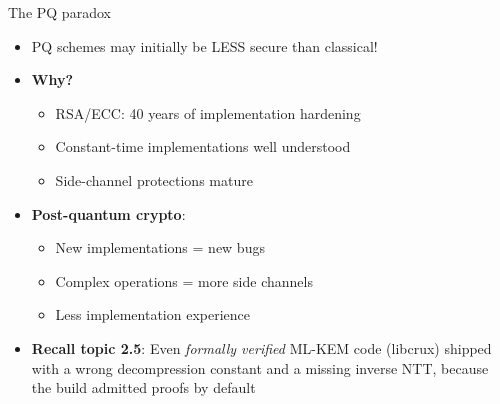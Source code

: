 \ifdefined\PRESENTATION\else\PassOptionsToClass{handout}{beamer}\fi\documentclass[aspectratio=169, lualatex]{beamer}
\begin{document}
\begin{frame}{The PQ paradox}
	\begin{itemize}
		\item PQ schemes may initially be LESS secure than classical!
		\item \textbf{Why?}
		      \begin{itemize}
			      \item RSA/ECC: 40 years of implementation hardening
			      \item Constant-time implementations well understood
			      \item Side-channel protections mature
		      \end{itemize}
		\item \textbf{Post-quantum crypto}:
		      \begin{itemize}
			      \item New implementations = new bugs
			      \item Complex operations = more side channels
			      \item Less implementation experience
		      \end{itemize}
		\item \textbf{Recall topic 2.5}: Even \textit{formally verified} ML-KEM code (libcrux) shipped with a wrong decompression constant and a missing inverse NTT, because the build admitted proofs by default
	\end{itemize}
\end{frame}
\end{document}
